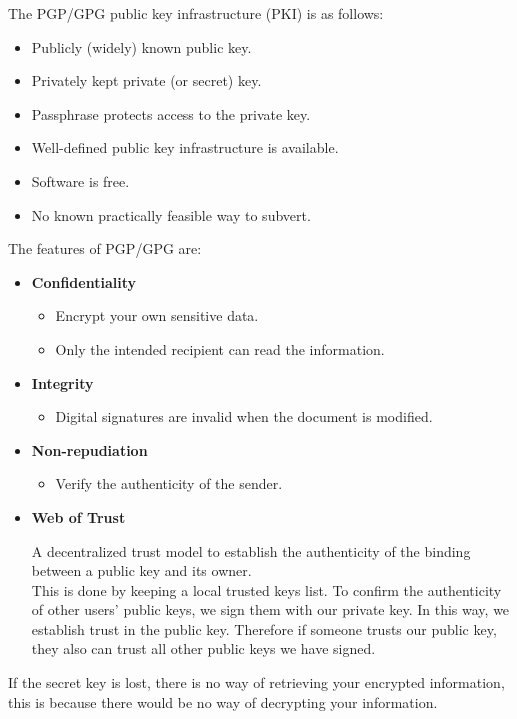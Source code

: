 \documentclass{article}
\begin{document}
The PGP/GPG public key infrastructure (PKI) is as follows:
\begin{itemize}
    \item Publicly (widely) known public key.
    \item Privately kept private (or secret) key.
    \item Passphrase protects access to the private key.
    \item Well-defined public key infrastructure is available.
    \item Software is free.
    \item No known practically feasible way to subvert.
\end{itemize}
The features of PGP/GPG are:
\begin{itemize}
    \item \textbf{Confidentiality}
    \begin{itemize}
        \item Encrypt your own sensitive data.
        \item Only the intended recipient can read the information.
    \end{itemize}
    \item \textbf{Integrity}
    \begin{itemize}
        \item Digital signatures are invalid when the document is modified.
    \end{itemize}
    \item \textbf{Non-repudiation}
    \begin{itemize}
        \item Verify the authenticity of the sender.
    \end{itemize}
    \item \textbf{Web of Trust}
    \begin{itemize}
        A decentralized trust model to establish the authenticity of the binding between a public key and its owner. \\
        This is done by keeping a local trusted keys list. To confirm the authenticity of other users' public keys, we sign them with our private key. In this way, we establish trust in the public key. Therefore if someone trusts our public key, they also can trust all other public keys we have signed.
    \end{itemize}
\end{itemize}

If the secret key is lost, there is no way of retrieving your encrypted information, this is because there would be no way of decrypting your information.
\end{document}

